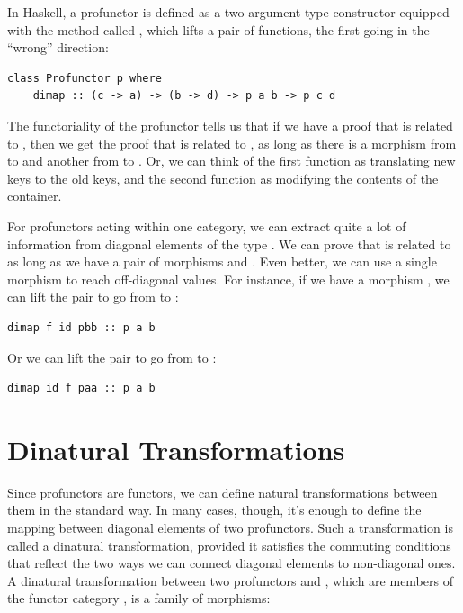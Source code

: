 In Haskell, a profunctor is defined as a two-argument type constructor
 equipped with the method called , which lifts a
pair of functions, the first going in the ``wrong'' direction:

\begin{verbatim}
class Profunctor p where
    dimap :: (c -> a) -> (b -> d) -> p a b -> p c d
\end{verbatim}
The functoriality of the profunctor tells us that if we have a proof
that  is related to , then we get the proof that
 is related to , as long as there is a morphism from
 to  and another from  to . Or,
we can think of the first function as translating new keys to the old
keys, and the second function as modifying the contents of the
container.

For profunctors acting within one category, we can extract quite a lot
of information from diagonal elements of the type . We
can prove that  is related to  as long as we have a
pair of morphisms  and
. Even better, we can use a single morphism to
reach off-diagonal values. For instance, if we have a morphism
, we can lift the pair
 to go from  to
:

\begin{verbatim}
dimap f id pbb :: p a b
\end{verbatim}
Or we can lift the pair  to go
from  to :

\begin{verbatim}
dimap id f paa :: p a b
\end{verbatim}

\section{Dinatural Transformations}\label{dinatural-transformations}

Since profunctors are functors, we can define natural transformations
between them in the standard way. In many cases, though, it's enough to
define the mapping between diagonal elements of two profunctors. Such a
transformation is called a dinatural transformation, provided it
satisfies the commuting conditions that reflect the two ways we can
connect diagonal elements to non-diagonal ones. A dinatural
transformation between two profunctors  and , which
are members of the functor category , is a
family of morphisms:

